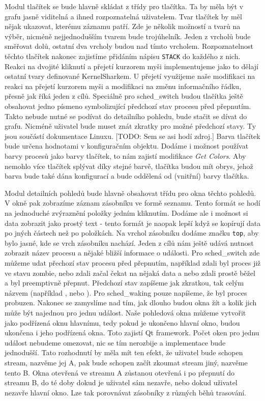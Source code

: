 Modul tlačítek se bude hlavně skládat z třídy pro tlačítka. Ta by měla být v grafu jasně viditelná a ihned rozpoznatelná uživatelem. Tvar tlačítek by měl nějak ukazovat, kterému záznamu patří. Zde je několik možností a tvarů na výběr, nicméně nejjednodušším tvarem bude trojúhelník. Jeden z vrcholů bude směřovat dolů, ostatní dva vrcholy budou nad tímto vrcholem. Rozpoznatelnost těchto tlačítek nakonec zajistíme přidáním nápisu \texttt{STACK} do každého z nich. Reakci na dvojité kliknutí a přejetí kurzorem myši implementujeme jako to dělají ostatní tvary definované KernelSharkem. U přejetí využijeme naše modifikaci na reakci na přejetí kurzorem myši a modifikaci na změnu informačního řádku, přesně jak říká jeden z cílů. Speciálně pro sched\_switch budou tlačítka ještě obsahovat jedno písmeno symbolizující předchozí stav procesu před přepnutím. Takto nebude nutné se podívat do detailního pohledu, bude stačit se dívat do grafu. Nicméně uživatel bude muset znát zkratky pro možné předchozí stavy. Ty jsou součástí dokumentace Linuxu. [TODO: Sem se asi hodí zdroj.] Barva tlačítek bude určena hodnotami v konfiguračním objektu. Dodáme i možnost používat barvy procesů jako barvy tlačítek, to nám zajistí modifikace \emph{Get Colors}. Aby nemohlo více tlačítek splývat díky stejné barvě, tlačítka budou mít obrys, jehož barva bude také dána konfigurací a bude oddělená od (vnitřní) barvy tlačítka.

Modul detailních pohledů bude hlavně obsahovat třídu pro okna těchto pohledů. V okně pak zobrazíme záznam zásobníku ve formě seznamu. Tento formát se hodí na jednoduché zvýraznění položky jedním kliknutím. Dodáme ale i možnost si data zobrazit jako prostý text - tento formát je naopak lepší když se kopírují data po jných částech než po položkách. Na vrchol zásobníku dodáme značku \texttt{top}, aby bylo jasné, kde se vrch zásobníku nachází. Jeden z cílů nám ještě udává nutnost zobrazit název procesu a nějaké bližší informace o události. Pro sched\_switch zde můžeme udat přechozí stav procesu před přepnutím, například zdali byl proces již ve stavu zombie, nebo zdali začal čekat na nějaká data a nebo zdali prostě běžel a byl preemptivně přepnut. Předchozí stav zapíšeme jak zkratkou, tak celým názvem (například , nebo ). Pro sched\_waking pouze napíšeme, že byl proces probuzen. Nakonec se zamyslíme nad tím, jak dlouho budou okna žít a kolik jich může být najednou pro jednu událost. Naše pohledová okna můžeme vytvořit jako podřízená oknu hlavnímu, tedy pokud je ukončeno hlavní okno, budou ukončena i jeho podřízená okna. Toto zajistí Qt framework. Počet oken pro jednu událost nebudeme omezovat, nic se tím nerozbije a implementace bude jednodušší. Tato rozhodnutí by měla mít ten efekt, že uživatel bude schopen stream, nazvěme jej A, pak bude schopen začít zkoumat stream jiný, nazvěme tento B. Okna otevřená ve streamu A zůstanou otevřená i po přepnutí do streamu B, do té doby dokud je uživatel sám nezavře, nebo dokud uživatel nezavře hlavní okno. Lze tak porovnávat zásobníky z různých běhů trasování.

